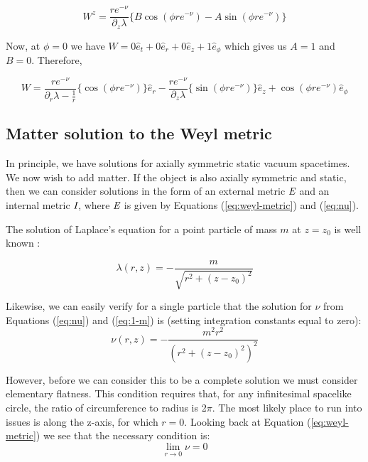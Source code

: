 \documentclass{article}
\begin{document}
\begin{equation}
W^{z}=\frac{re^{-\nu}}{\partial_{z}\lambda}\{B\cos(\phi re^{-\nu})-A\sin(\phi re^{-\nu})\}
\end{equation}

Now, at $\phi=0$ we have $W=0\hat{e}_{t}+0\hat{e}_{r}+0\hat{e}_{z}+1\hat{e}_{\phi}$ which gives us $A=1$ and $B=0$. Therefore,

\begin{equation}
W=\frac{re^{-\nu}}{\partial_{r}\lambda-\frac{1}{r}}\{\cos(\phi re^{-\nu})\}\hat{e}_{r}-\frac{re^{-\nu}}{\partial_{z}\lambda}\{\sin(\phi re^{-\nu})\}\hat{e}_{z}+\cos(\phi re^{-\nu})\hat{e}_{\phi}
\end{equation}



\subsection{Matter solution to the Weyl metric}

In principle, we have solutions for axially symmetric static vacuum spacetimes. We now wish to add matter. If the object is also axially symmetric and static, then we can consider solutions in the form of an external metric $\emph{E}$ and an internal metric $\emph{I}$, where $\emph{E}$ is given by Equations (\ref{eq:weyl-metric}) and (\ref{eq:nu}).

The solution of Laplace's equation for a point particle of mass $m$ at $z=z_{0}$ is well known \cite{letelier1997superposition}:

\begin{equation}
\lambda (r,z)=-\frac{m}{\sqrt{r^{2}+\left(z-z_{0}\right)^{2}}}\label{eq:1-m}
\end{equation}

Likewise, we can easily verify for a single particle that the solution for $\nu$ from Equations (\ref{eq:nu}) and (\ref{eq:1-m}) is (setting integration constants equal to zero):
\begin{equation}
\nu (r,z)=-\frac{m^{2}r^{2}}{\left(r^{2}+\left(z-z_{0}\right)^{2}\right)^{2}}
\end{equation}

However, before we can consider this to be a complete solution we must consider elementary flatness. This condition requires that, for any infinitesimal spacelike circle, the ratio of circumference to radius is 2$\pi$. The most likely place to run into issues is along the z-axis, for which $r=0$. Looking back at Equation (\ref{eq:weyl-metric}) we see that the necessary condition is:
\begin{equation}
\lim_{r\rightarrow 0}\nu=0\label{eq:elem-flat}
\end{equation}
\end{document}
